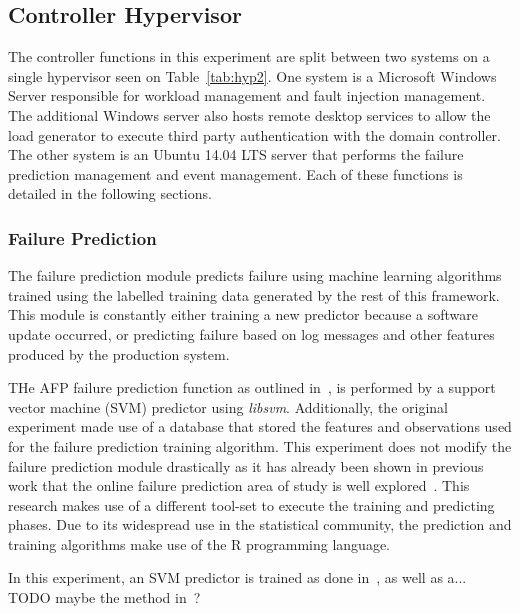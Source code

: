 \tabHypervisorOne
\tabHypervisorTwo

\setcounter{secnumdepth}{5}

\subsection{Controller Hypervisor} \label{sec:controller} %
The controller functions in this experiment are split between two systems on a
single hypervisor seen on Table~\ref{tab:hyp2}.  One system is a Microsoft
Windows Server responsible for workload management and fault injection
management.  The additional Windows server also hosts remote desktop services
to allow the load generator to execute third party authentication with the
domain controller.  The other system is an Ubuntu 14.04 LTS server that
performs the failure prediction management and event management.  Each of
these functions is detailed in the following sections.

\subsubsection{Failure Prediction} \label{sec:failurePrediction} %
The failure prediction module predicts failure using machine learning
algorithms trained using the labelled training data generated by the rest of
this framework.  This module is constantly either training a new predictor
because a software update occurred, or predicting failure based on log messages
and other features produced by the production system.

THe AFP failure prediction function as outlined in~\cite{irrera2015}, is
performed by a support vector machine (SVM) predictor using \emph{libsvm}.
Additionally, the original experiment made use of a database that stored the
features and observations used for the failure prediction training algorithm.
This experiment does not modify the failure prediction module drastically as it
has already been shown in previous work that the online failure prediction area
of study is well explored~\cite{salfnerSurvey}.  This research makes use of a
different tool-set to execute the training and predicting phases.  Due to its
widespread use in the statistical community, the prediction and training
algorithms make use of the R programming language.

In this experiment, an SVM predictor is trained as done in~\cite{irrera2015},
as well as a... TODO maybe the method in~\cite{watanabe2014}?

